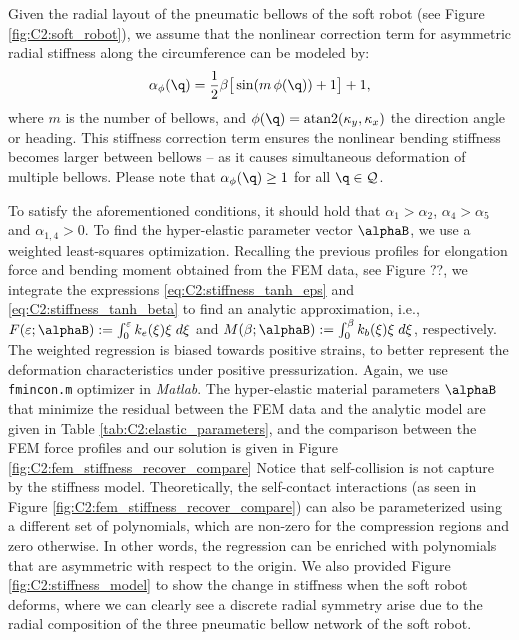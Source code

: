 %
\begin{asm}
Given the radial layout of the pneumatic bellows of the soft robot (see Figure \ref{fig:C2:soft_robot}), we assume that the nonlinear correction term for asymmetric radial stiffness along the circumference can be modeled by:
%
\begin{equation}
\alpha_\phi (\q) = \frac{1}{2}\beta \big[\sin( m \,\phi(\q)) + 1 \big] + 1,
\end{equation}
%
where $m$ is the number of bellows, and $\phi(\q) = \text{atan2}(\kappa_y,\kappa_x)$ the direction angle or heading. This stiffness correction term ensures the nonlinear bending stiffness becomes larger between bellows -- as it causes simultaneous deformation of multiple bellows. Please note that $\alpha_\phi(\q) \ge 1$ for all $\q \in \mathcal{Q}$.
\end{asm}

To satisfy the aforementioned conditions, it should hold that $\alpha_1 > \alpha_2 $, $\alpha_4 > \alpha_5$ and $\alpha_{1,4} > 0$. \editl To find the hyper-elastic parameter vector $\alphaB$, we use a weighted least-squares optimization. Recalling the previous profiles for elongation force and bending moment obtained from the FEM data, see Figure ??, we integrate the expressions \eqref{eq:C2:stiffness_tanh_eps} and \eqref{eq:C2:stiffness_tanh_beta} to find an analytic approximation, i.e., $F(\varepsilon; \alphaB):= \int_0^\varepsilon k_e(\xi) \xi \; d\xi$ and $M(\beta; \alphaB):= \int_0^\beta k_b(\xi) \xi \; d\xi$, respectively. The weighted regression is biased towards positive strains, to better represent the deformation characteristics under positive pressurization. Again, we use \texttt{fmincon.m} optimizer in \textit{Matlab}. The hyper-elastic material parameters $\alphaB$ that minimize the residual between the FEM data and the analytic model are given in Table \ref{tab:C2:elastic_parameters}, and the comparison between the FEM force profiles and our solution is given in Figure \ref{fig:C2:fem_stiffness_recover_compare} Notice that self-collision is not capture by the stiffness model. Theoretically, the self-contact interactions (as seen in Figure \ref{fig:C2:fem_stiffness_recover_compare}) can also be parameterized using a different set of polynomials, which are non-zero for the compression regions and zero otherwise. In other words, the regression can be enriched with polynomials that are asymmetric with respect to the origin. We also provided Figure \ref{fig:C2:stiffness_model} to show the change in stiffness when the soft robot deforms, where we can clearly see a discrete radial symmetry arise due to the radial composition of the three pneumatic bellow network of the soft robot. \editr



